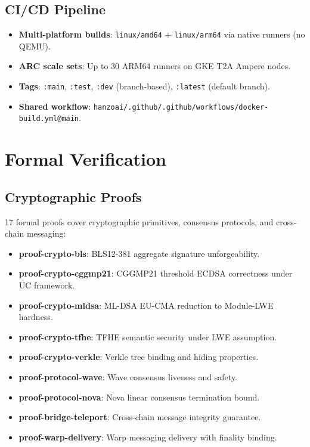 \documentclass[11pt,letterpaper]{article}
\begin{document}
\subsection{CI/CD Pipeline}

\begin{itemize}
\item \textbf{Multi-platform builds}: \texttt{linux/amd64} + \texttt{linux/arm64} via native runners (no QEMU).
\item \textbf{ARC scale sets}: Up to 30 ARM64 runners on GKE T2A Ampere nodes.
\item \textbf{Tags}: \texttt{:main}, \texttt{:test}, \texttt{:dev} (branch-based), \texttt{:latest} (default branch).
\item \textbf{Shared workflow}: \texttt{hanzoai/.github/.github/workflows/docker-build.yml@main}.
\end{itemize}

\section{Formal Verification}

\subsection{Cryptographic Proofs}

17 formal proofs cover cryptographic primitives, consensus protocols, and cross-chain messaging:

\begin{itemize}
\item \textbf{proof-crypto-bls}: BLS12-381 aggregate signature unforgeability.
\item \textbf{proof-crypto-cggmp21}: CGGMP21 threshold ECDSA correctness under UC framework.
\item \textbf{proof-crypto-mldsa}: ML-DSA EU-CMA reduction to Module-LWE hardness.
\item \textbf{proof-crypto-tfhe}: TFHE semantic security under LWE assumption.
\item \textbf{proof-crypto-verkle}: Verkle tree binding and hiding properties.
\item \textbf{proof-protocol-wave}: Wave consensus liveness and safety.
\item \textbf{proof-protocol-nova}: Nova linear consensus termination bound.
\item \textbf{proof-bridge-teleport}: Cross-chain message integrity guarantee.
\item \textbf{proof-warp-delivery}: Warp messaging delivery with finality binding.
\end{itemize}
\end{document}
